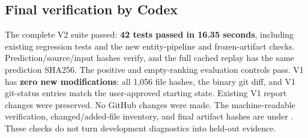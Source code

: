 \subsection*{Final verification by Codex}
The complete V2 suite passed: \textbf{42 tests passed in 16.35 seconds}, including existing regression tests and the new entity-pipeline and frozen-artifact checks. Prediction/source/input hashes verify, and the full cached replay has the same prediction SHA256. The positive and empty-ranking evaluation controls pass. V1 has \textbf{zero new modifications}: all 1,056 file hashes, the binary git diff, and V1 git-status entries match the user-approved starting state. Existing V1 report changes were preserved. No GitHub changes were made.
The machine-readable verification, changed/added-file inventory, and final artifact hashes are under . These checks do not turn development diagnostics into held-out evidence.
